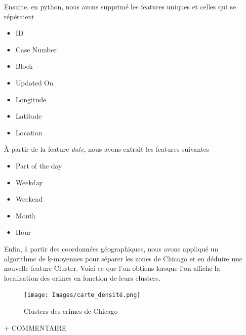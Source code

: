 \documentclass{article}
\begin{document}
    Ensuite, en python, nous avons supprimé les features uniques et celles qui se répétaient
    \begin{itemize}
	    \item ID
	    \item Case Number
	    \item Block
	    \item Updated On
	    \item Longitude
	    \item Latitude
	    \item Location
    \end{itemize}
    À partir de la feature \textit{date}, nous avons extrait les features suivantes
    \begin{itemize}
	    \item Part of the day
	    \item Weekday
	    \item Weekend
	    \item Month
	    \item Hour
    \end{itemize}
    Enfin, à partir des coordonnées géographiques, nous avons appliqué un algorithme de k-moyennes pour séparer les zones de Chicago et en déduire une nouvelle feature Cluster. 
    Voici ce que l'on obtiens lorsque l'on affiche la localisation des crimes en fonction de leurs clusters.
    \begin{figure}[H]
            \centering
	    \texttt{[image: Images/carte\_densité.png]}
	    \caption{Clusters des crimes de Chicago}
    \end{figure}
    + COMMENTAIRE
\end{document}
